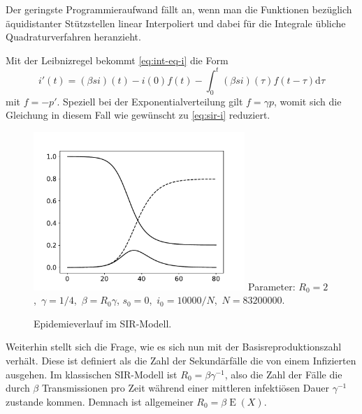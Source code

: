 \documentclass[a4paper,10pt,fleqn,twocolumn,twoside,dvipdfmx]{scrartcl}
\numberwithin{equation}{section}
\begin{document}
Der geringste Programmieraufwand fällt an, wenn man die Funktionen
bezüglich äquidistanter Stützstellen linear Interpoliert und dabei
für die Integrale übliche Quadraturverfahren heranzieht.

Mit der Leibnizregel bekommt \eqref{eq:int-eq-i} die Form
\begin{equation}
i'(t) = (\beta si)(t)-i(0)f(t)-\!\int_0^t \!(\beta si)(\tau)f(t-\tau)\mathrm d\tau
\end{equation}
mit $f=-p'$. Speziell bei der Exponentialverteilung gilt $f=\gamma p$,
womit sich die Gleichung in diesem Fall wie gewünscht zu
\eqref{eq:sir-i} reduziert.

\begin{figure}
\begin{center}
\includegraphics[width=80mm]{img/01-sir.pdf}
Parameter: $R_0 = 2$,\, $\gamma = 1/4$,\, $\beta = R_0\gamma$,\newline
$s_0 = 0$,\, $i_0 = 10000/N$,\, $N = 83200000$.
\end{center}
\caption{Epidemieverlauf im SIR-Modell.}
\end{figure}

Weiterhin stellt sich die Frage, wie es sich nun mit der
Basisreproduktionszahl verhält. Diese ist definiert als die Zahl der
Sekundärfälle die von einem Infizierten ausgehen. Im klassischen
SIR-Modell ist $R_0 = \beta\gamma^{-1}$, also die Zahl der Fälle die
durch $\beta$ Transmissionen pro Zeit während einer mittleren
infektiösen Dauer $\gamma^{-1}$ zustande kommen. Demnach ist
allgemeiner $R_0 = \beta\operatorname{E}(X)$.
\end{document}
